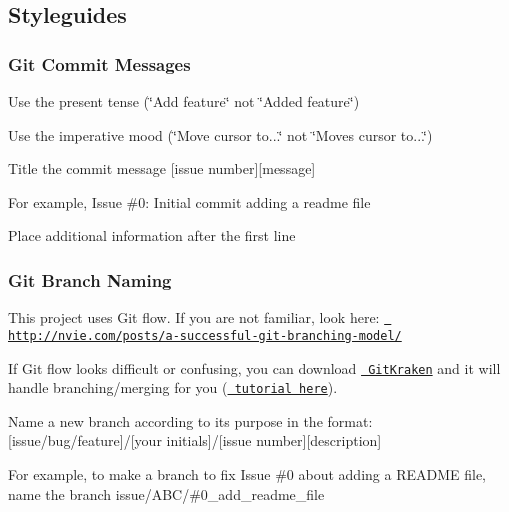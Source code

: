 \subsection*{Styleguides}

\subsubsection*{Git Commit Messages}


\begin{DoxyItemize}
\item Use the present tense (\char`\"{}\+Add feature\char`\"{} not \char`\"{}\+Added feature\char`\"{})
\item Use the imperative mood (\char`\"{}\+Move cursor to...\char`\"{} not \char`\"{}\+Moves cursor to...\char`\"{})
\item Title the commit message \mbox{[}issue number\mbox{]}\mbox{[}message\mbox{]}
\begin{DoxyItemize}
\item For example, {\ttfamily Issue \#0\+: Initial commit adding a readme file}
\end{DoxyItemize}
\item Place additional information after the first line
\end{DoxyItemize}

\subsubsection*{Git Branch Naming}


\begin{DoxyItemize}
\item This project uses Git flow. If you are not familiar, look here\+: \href{http://nvie.com/posts/a-successful-git-branching-model/}{\texttt{ http\+://nvie.\+com/posts/a-\/successful-\/git-\/branching-\/model/}}
\begin{DoxyItemize}
\item If Git flow looks difficult or confusing, you can download \href{https://www.gitkraken.com/}{\texttt{ Git\+Kraken}} and it will handle branching/merging for you (\href{https://support.gitkraken.com/git-workflows-and-extensions/git-flow}{\texttt{ tutorial here}}).
\end{DoxyItemize}
\item Name a new branch according to its purpose in the format\+: \mbox{[}issue/bug/feature\mbox{]}/\mbox{[}your initials\mbox{]}/\mbox{[}issue number\mbox{]}\mbox{[}description\mbox{]}
\begin{DoxyItemize}
\item For example, to make a branch to fix Issue \#0 about adding a R\+E\+A\+D\+ME file, name the branch {\ttfamily issue/\+A\+B\+C/\#0\+\_\+add\+\_\+readme\+\_\+file}
\end{DoxyItemize}
\end{DoxyItemize}

